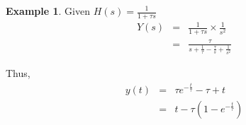 \documentclass[11pt]{article} %
\theoremstyle{definition}
\newtheorem{example}{Example}[subsection]
\begin{document}
\begin{example}

Given $H(s) = \frac{1}{1+\tau s}$
\begin{eqnarray}
Y(s) &=& \frac{1}{1+\tau s} \times \frac{1}{s^2}  \nonumber  \\
&=& \frac{\tau}{s+\frac{1}{\tau} - \frac{\tau}{s} + \frac{1}{s^2}}
\end{eqnarray}

Thus,
\begin{eqnarray}
y(t) &=& \tau e^{-\frac{t}{\tau}} - \tau + t \nonumber \\
&=& t-\tau\left(1-e^{-\frac{t}{\tau}}\right)
\end{eqnarray}
\end{example}
\end{document}
